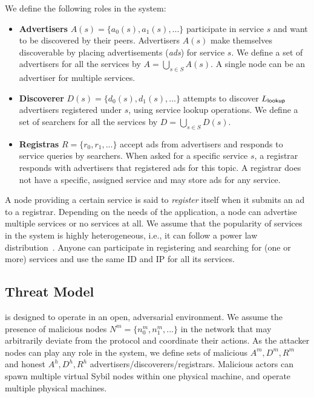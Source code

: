 We define the following roles in the system:
\begin{itemize}
    \item \textbf{Advertisers} $A(s) = \{a_0(s), a_1(s),...\}$ participate in service $s$ and want to be discovered by their peers.
    Advertisers $A(s)$ make themselves discoverable by placing advertisements (\emph{ads}) for service $s$. We define a set of advertisers for all the services by $A = \bigcup_{s \in S} A(s)$.
    A single node can be an advertiser for multiple services.
    \item \textbf{Discoverer} $D(s) = \{d_0(s), d_1(s),...\}$ attempts to discover $L_{\mathsf{lookup}}$ advertisers registered under $s$, using service lookup operations. We define a set of searchers for all the services by $D = \bigcup_{s \in S} D(s)$.
    \item \textbf{Registras} $R = \{r_0, r_1,...\}$ accept ads from advertisers and responds to service queries by searchers. 
    When asked for a specific service $s$, a registrar responds with advertisers that registered ads for this topic.
    A registrar does not have a specific, assigned service and may store ads for any service.
\end{itemize}

A node providing a certain service is said to \emph{register} itself when it submits an ad to a registrar. %
Depending on the needs of the application, a node can advertise multiple services or no services at all. 
We assume that the popularity of services in the system is highly heterogeneous, i.e., it can follow a power law distribution~\cite{kim2018measuring}.
Anyone can participate in registering and searching for (one or more) services and use the same ID and IP for all its services. 

\subsection{Threat Model}
\label{sec:threat}
\sysname is designed to operate in an open, adversarial environment.
We assume the presence of malicious nodes $N^m = \{n^m_0, n^m_1, ...\}$ in the network that may arbitrarily deviate from the protocol and coordinate their actions. As the attacker nodes can play any role in the system, we define sets of malicious $A^m, D^m, R^m$ and honest $A^h, D^h, R^h$ advertisers/discoverers/registrars. 
Malicious actors can spawn multiple virtual Sybil nodes within one physical machine, and operate multiple physical machines.




